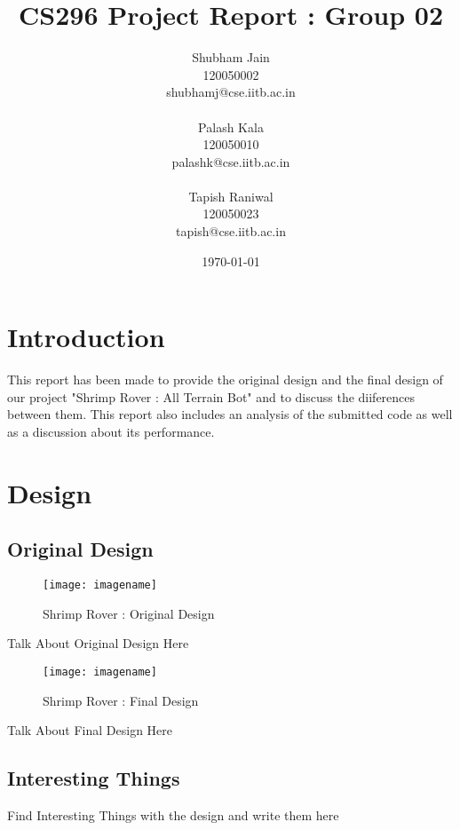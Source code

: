 \documentclass[english, 11pt]{article}
\begin{document}
\title{CS296 Project Report : Group 02}

\author{Shubham Jain\\
		 120050002\\
		 shubhamj@cse.iitb.ac.in\\
		 \\
		 Palash Kala\\
		 120050010\\
		 palashk@cse.iitb.ac.in\\
		 \\
		 Tapish Raniwal\\
		 120050023\\
		 tapish@cse.iitb.ac.in\\
		 }

\date{\today}

\maketitle

\section{Introduction}
This report has been made to provide the original design and the final design of our project "Shrimp Rover : All Terrain Bot" 
and to discuss the diiferences between them. This report also includes an analysis of the submitted code as well as a 
discussion about its performance.

\section{Design}
\subsection{Original Design}
\begin{figure}
	\begin{center}
		\texttt{[image: imagename]} %
	\end{center}
	\caption{Shrimp Rover : Original Design}
\end{figure}
Talk About Original Design Here
\begin{figure}
	\begin{center}
		\texttt{[image: imagename]}
	\end{center}
	\caption{Shrimp Rover : Final Design}
\end{figure}
Talk About Final Design Here
\subsection{Interesting Things}
Find Interesting Things with the design and write them here
\end{document}
